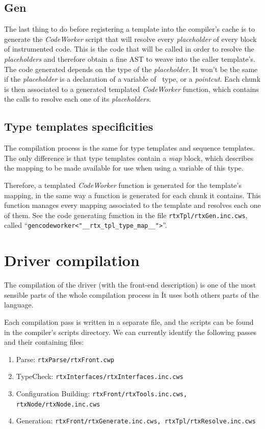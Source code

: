 \documentclass[american]{rtxreport}
\begin{document}
\subsection{Gen}

The last thing to do before registering a template into the compiler's cache is
to generate the \emph{CodeWorker} script that will resolve every
\emph{placeholder} of every block of instrumented code. This is the code that
will be called in order to resolve the \emph{placeholders} and therefore obtain
a fine AST to weave into the caller template's. The code generated
depends on the type of the \emph{placeholder}. It won't be the same if the
\emph{placeholder} is a declaration of a variable of \rtx\ type, or a
\emph{pointcut}. Each chunk is then associated to a generated templated
\emph{CodeWorker} function, which contains the calls to resolve each
one of its \emph{placeholders}.

\subsection{Type templates specificities}

The compilation process is the same for type templates and sequence templates.
The only difference is that type templates contain a \emph{map} block,
which describes the mapping to be made available for use when using a variable
of this type.

Therefore, a templated \emph{CodeWorker} function is generated for the
template's mapping, in the same way a function is generated for each chunk it
contains. This function manages every mapping associated to the template and
resolves each one of them. See the code generating function in the file
\texttt{rtxTpl/rtxGen.inc.cws}, called
``\texttt{gencodeworker<"\_\_rtx\_tpl\_type\_map\_\_">}''.

\section{Driver compilation}

The compilation of the driver (with the front-end description) is one of the
most sensible parts of the whole compilation process in \rtx\. It uses both
others parts of the language.

Each compilation pass is written in a separate file, and the scripts can be
found in the compiler's scripts directory. We can currently identify the
following passes and their containing files:
\begin{enumerate}
    \item Parse: \texttt{rtxParse/rtxFront.cwp}
    \item TypeCheck: \texttt{rtxInterfaces/rtxInterfaces.inc.cws}
    \item Configuration Building: \texttt{rtxFront/rtxTools.inc.cws,
                                          rtxNode/rtxNode.inc.cws}
    \item Generation: \texttt{rtxFront/rtxGenerate.inc.cws,
                              rtxTpl/rtxResolve.inc.cws}
\end{enumerate}
\end{document}
